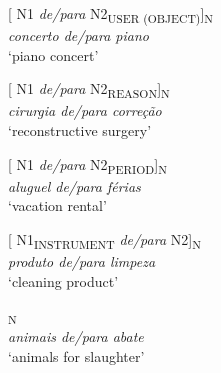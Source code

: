 \documentclass[output=paper]{langsci/langscibook}
\begin{document}
\begin{exe}\ex\begin{minipage}[t]{0.4\textwidth}    %
[ N1 \textit{de/para} N2\textsubscript{USER (OBJECT)}]\textsubscript{N}\\
\textit{concerto de/para piano}\\
`piano concert'
\end{minipage}\hfill%
\begin{minipage}[t]{0.45\textwidth}
[ N1 \textit{de/para} N2\textsubscript{REASON}]\textsubscript{N}\\
\textit{cirurgia de/para correção}\\
`reconstructive surgery'
\end{minipage}
\end{exe}

\begin{exe}\ex\begin{minipage}[t]{0.4\textwidth}
[ N1 \textit{de/para} N2\textsubscript{PERIOD}]\textsubscript{N}\\
\textit{aluguel de/para férias}\\
`vacation rental'
\end{minipage}\hfill\begin{minipage}[t]{0.45\textwidth}
[ N1\textsubscript{INSTRUMENT} \textit{de/para} N2]\textsubscript{N}\\
\textit{produto de/para limpeza}\\
`cleaning product'
\end{minipage}\end{exe}

\ea{}\textsubscript{N}\\
\textit{animais de/para abate}\\
`animals for slaughter'
\z
\end{document}
